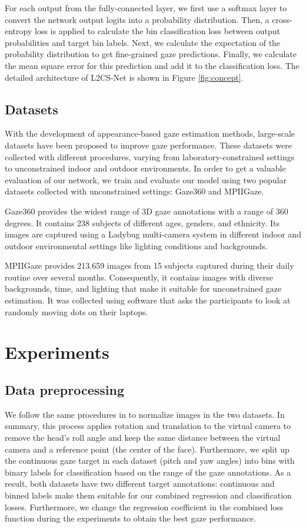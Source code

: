 \documentclass{article}
\begin{document}
For each output from the fully-connected layer, we first use a softmax layer to convert the network output logits into a probability distribution. Then, a cross-entropy loss is applied to calculate the bin classification loss between output probabilities and target bin labels. Next, we calculate the expectation of the probability distribution to get fine-grained gaze predictions. Finally, we calculate the mean square error for this prediction and add it to the classification loss. The detailed architecture of L2CS-Net is shown in Figure \ref{fig:concept}.

\subsection{Datasets}

With the development of appearance-based gaze estimation methods, 
large-scale datasets have been proposed to improve gaze performance. These datasets were collected with different procedures, varying from laboratory-constrained settings to unconstrained indoor and outdoor environments. In order to get a valuable evaluation of our network, we train and evaluate our model using two popular datasets collected with unconstrained settings: Gaze360 and MPIIGaze.

Gaze360 \cite{Gaze360} provides the widest range of 3D gaze annotations with a range of 360 degrees. It contains 238 subjects of different ages, genders, and ethnicity. Its images are captured using a Ladybug multi-camera system in different indoor and outdoor environmental settings like lighting conditions and backgrounds.

MPIIGaze \cite{Mpiigaze1} provides 213.659 images from 15 subjects captured during their daily routine over several months. Consequently, it contains images with diverse backgrounds, time, and lighting that make it suitable for unconstrained gaze estimation. It was collected using software that asks the participants to look at randomly moving dots on their laptops.




\section{Experiments}
\label{sec:experiments}
\subsection{Data preprocessing}
We follow the same procedures in \cite{Mpiigaze1} to normalize images in the two datasets. In summary, this process applies rotation and translation to the virtual camera to remove the head's roll angle and keep the same distance between the virtual camera and a reference point (the center of the face). Furthermore, we split up the continuous gaze target in each dataset (pitch and yaw angles) into bins with binary labels for classification based on the range of the gaze annotations. As a result, both datasets have two different target annotations: continuous and binned labels make them suitable for our combined regression and classification losses. Furthermore, we change the regression coefficient in the combined loss function during the experiments to obtain the best gaze performance.
\end{document}
